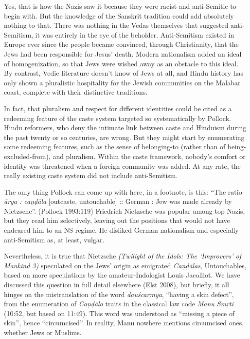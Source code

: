 Yes, that is how the Nazis saw it because they were racist and anti-Semitic to begin with. But the knowledge of the Sanskrit tradition could add absolutely nothing to that. There was nothing in the Vedas themselves that suggested anti-Semitism, it was entirely in the eye of the beholder. Anti-Semitism existed in Europe ever since the people became convinced, through Christianity, that the Jews had been responsible for Jesus’ death. Modern nationalism added an ideal of homogenization, so that Jews were wished away as an obstacle to this ideal. By contrast, Vedic literature doesn’t know of Jews at all, and Hindu history has only shown a pluralistic hospitality for the Jewish communities on the Malabar coast, complete with their distinctive traditions.

In fact, that pluralism and respect for different identities could be cited as a redeeming feature of the caste system targeted so systematically by Pollock. Hindu reformers, who deny the intimate link between caste and Hinduism during the past twenty or so centuries, are wrong. But they might start by enumerating some redeeming features, such as the sense of belonging-to (rather than of being-excluded-from), and pluralism. Within the caste framework, nobody’s comfort or identity was threatened when a foreign community was added. At any rate, the really existing caste system did not include anti-Semitism.

The only thing Pollock can come up with here, in a footnote, is this: “The ratio {\sl ārya : caṇḍāla} [outcaste, untouchable] :: German : Jew was made already by Nietzsche”. (Pollock 1993:119) Friedrich Nietzsche was popular among top Nazis, but they read him selectively, leaving out the positions that would not have endeared him to an NS regime. He disliked German nationalism and especially anti-Semitism as, at least, vulgar.

Nevertheless, it is true that Nietzsche {\sl (Twilight of the Idols: The ‘Improvers’ of Mankind 3)} speculated on the Jews’ origin as emigrated {\sl Caṇḍālas}, Untouchables, based on more speculations by the amateur-Indologist Louis Jacolliot. We have discussed this question in full detail elsewhere (Elst 2008), but briefly, it all hinges on the mistranslation of the word {\sl dauścarmya}, “having a skin defect”, from the enumeration of {\sl Caṇḍāla} traits in the classical law code {\sl Manu Smṛti} (10:52, but based on 11:49). This word was understood as “missing a piece of skin”, hence “circumcised”. In reality, Manu nowhere mentions circumcised ones, whether Jews or Muslims.

